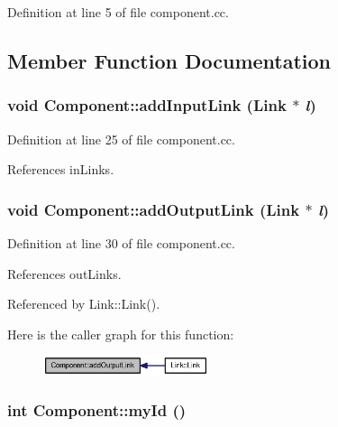 Definition at line 5 of file component.cc.

\subsection{Member Function Documentation}
\subsubsection[{addInputLink}]{\setlength{\rightskip}{0pt plus 5cm}void Component::addInputLink ({\bf Link} $\ast$ {\em l})}\label{classComponent_9c7c91fe01f0d204cbc79b597d8236fe}




Definition at line 25 of file component.cc.

References inLinks.
\subsubsection[{addOutputLink}]{\setlength{\rightskip}{0pt plus 5cm}void Component::addOutputLink ({\bf Link} $\ast$ {\em l})}\label{classComponent_aed97b38bbc44deddf329aa473e23b25}




Definition at line 30 of file component.cc.

References outLinks.

Referenced by Link::Link().

Here is the caller graph for this function:\nopagebreak
\begin{figure}[H]
\begin{center}
\leavevmode
\includegraphics[width=137pt]{classComponent_aed97b38bbc44deddf329aa473e23b25_icgraph}
\end{center}
\end{figure}
\subsubsection[{myId}]{\setlength{\rightskip}{0pt plus 5cm}int Component::myId ()\hspace{0.3cm}{\tt  [inline]}}\label{classComponent_af44955457bc84fa39a346ee70db916f}




